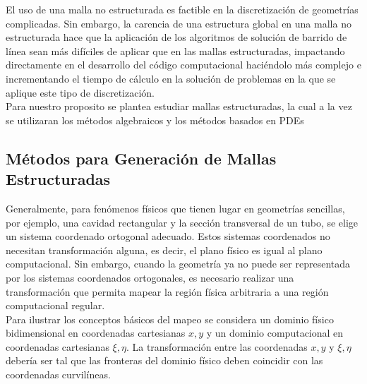 \documentclass[11pt,letterpaper]{article}
\begin{document}

El uso de una malla no estructurada es factible en la discretización de geometrías complicadas. Sin embargo, la carencia de una estructura global en una malla no estructurada hace que la aplicación de los algoritmos de solución de barrido de línea sean más difíciles de aplicar que en las mallas estructuradas, impactando directamente en el desarrollo del código computacional haciéndolo más complejo e incrementando el tiempo de cálculo en la solución de problemas en la que se aplique este tipo de discretización.\\

Para nuestro proposito se plantea estudiar mallas estructuradas, la cual a la vez se utilizaran los m\'etodos algebraicos y los m\'etodos basados en PDEs
\\

\subsection{Métodos para Generación de Mallas Estructuradas}

Generalmente, para fen\'omenos f\'isicos que tienen lugar en geometr\'ias sencillas, por ejemplo, una cavidad rectangular y la secci\'on transversal de un tubo, se elige un sistema coordenado ortogonal adecuado. Estos sistemas coordenados no necesitan transformación alguna, es decir, el plano físico es igual al plano computacional. Sin embargo, cuando la geometría ya no puede ser representada por los sistemas coordenados ortogonales, es necesario realizar una transformaci\'on que permita mapear la regi\'on f\'isica arbitraria a una regi\'on computacional regular.\\

Para ilustrar los conceptos b\'asicos del mapeo se considera un dominio físico bidimensional en coordenadas cartesianas $x,y$ y un dominio computacional en coordenadas cartesianas $\xi,\eta$. La transformaci\'on entre las coordenadas $x,y$ y $\xi,\eta$ debería ser tal que las fronteras del dominio f\'isico deben coincidir con las coordenadas curvil\'ineas.
\end{document}
